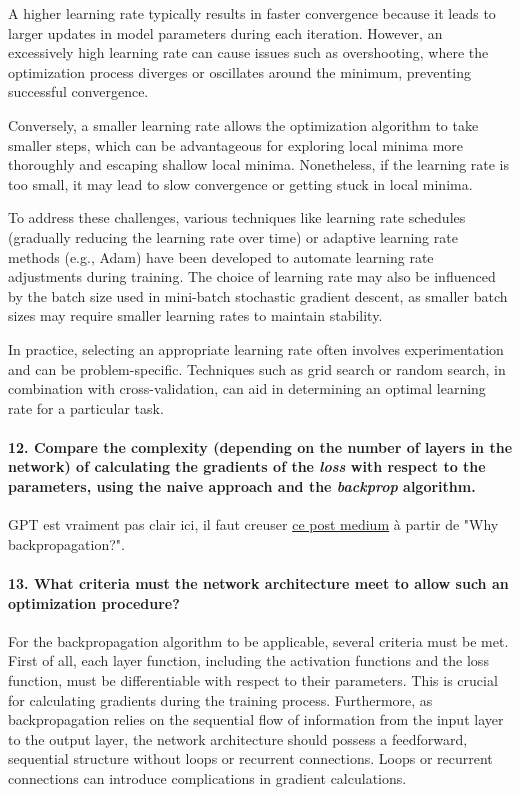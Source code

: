 \documentclass{article}
\theoremstyle{plain}%
\theoremstyle{definition}
\theoremstyle{remark}
\begin{document}
A higher learning rate typically results in faster convergence because it leads to larger updates in model parameters during each iteration. However, an excessively high learning rate can cause issues such as overshooting, where the optimization process diverges or oscillates around the minimum, preventing successful convergence.

Conversely, a smaller learning rate allows the optimization algorithm to take smaller steps, which can be advantageous for exploring local minima more thoroughly and escaping shallow local minima. Nonetheless, if the learning rate is too small, it may lead to slow convergence or getting stuck in local minima.

To address these challenges, various techniques like learning rate schedules (gradually reducing the learning rate over time) or adaptive learning rate methods (e.g., Adam) have been developed to automate learning rate adjustments during training. The choice of learning rate may also be influenced by the batch size used in mini-batch stochastic gradient descent, as smaller batch sizes may require smaller learning rates to maintain stability.

In practice, selecting an appropriate learning rate often involves experimentation and can be problem-specific. Techniques such as grid search or random search, in combination with cross-validation, can aid in determining an optimal learning rate for a particular task.

\paragraph{12. Compare the complexity (depending on the number of layers in the network) of calculating the gradients of the \textit{loss} with respect to the parameters, using the naive approach and the \textit{backprop} algorithm.}
GPT est vraiment pas clair ici, il faut creuser \href{https://medium.com/spidernitt/breaking-down-neural-networks-an-intuitive-approach-to-backpropagation-3b2ff958794c}{ce post medium} à partir de "Why backpropagation?".

\paragraph{13. What criteria must the network architecture meet to allow such an optimization procedure?}
For the backpropagation algorithm to be applicable, several criteria must be met. First of all, each layer function, including the activation functions and the loss function, must be differentiable with respect to their parameters. This is crucial for calculating gradients during the training process. Furthermore, as backpropagation relies on the sequential flow of information from the input layer to the output layer, the network architecture should possess a feedforward, sequential structure without loops or recurrent connections. Loops or recurrent connections can introduce complications in gradient calculations.
\end{document}
